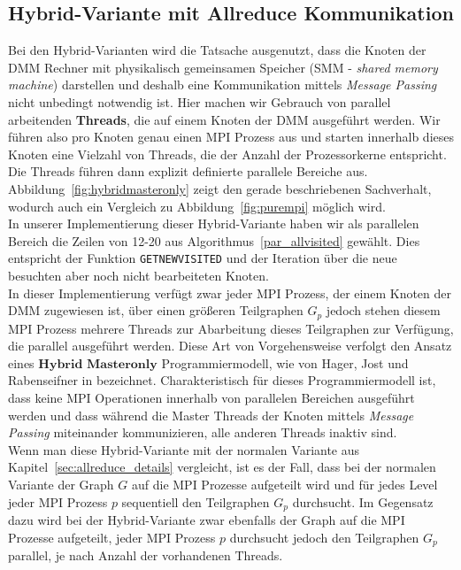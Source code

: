 \documentclass[11pt,a4paper]{article}
\begin{document}
\subsection{Hybrid-Variante mit Allreduce Kommunikation}
Bei den Hybrid-Varianten wird die Tatsache ausgenutzt, dass die Knoten der DMM Rechner mit physikalisch gemeinsamen Speicher (SMM - \textit{shared memory machine}) darstellen und deshalb eine Kommunikation mittels \textit{Message Passing} nicht unbedingt notwendig ist. Hier machen wir Gebrauch von parallel arbeitenden \textbf{Threads}, die auf einem Knoten der DMM ausgeführt werden. Wir führen also pro Knoten genau einen MPI Prozess aus und starten innerhalb dieses Knoten eine Vielzahl von Threads, die der Anzahl der Prozessorkerne entspricht. Die Threads führen dann explizit definierte parallele Bereiche aus. Abbildung~\ref{fig:hybridmasteronly} zeigt den gerade beschriebenen Sachverhalt, wodurch auch ein Vergleich zu Abbildung~\ref{fig:purempi} möglich wird.\\
In unserer Implementierung dieser Hybrid-Variante haben wir als parallelen Bereich die Zeilen von 12-20 aus Algorithmus~\ref{par_allvisited} gewählt. Dies entspricht der Funktion \lstinline{GETNEWVISITED} und der Iteration über die neue besuchten aber noch nicht bearbeiteten Knoten.\\
In dieser Implementierung verfügt zwar jeder MPI Prozess, der einem Knoten der DMM zugewiesen ist, über einen größeren Teilgraphen \(G_{p}\) jedoch stehen diesem MPI Prozess mehrere Threads zur Abarbeitung dieses Teilgraphen zur Verfügung, die parallel ausgeführt werden. Diese Art von Vorgehensweise verfolgt den Ansatz eines \textit{$\textbf{Hybrid Masteronly}$} Programmiermodell, wie von Hager, Jost und Rabenseifner in \cite{hybrid} bezeichnet. Charakteristisch für dieses Programmiermodell ist, dass keine MPI Operationen innerhalb von parallelen Bereichen ausgeführt werden und dass während die Master Threads der Knoten mittels \textit{Message Passing} miteinander kommunizieren, alle anderen Threads inaktiv sind.\\
Wenn man diese Hybrid-Variante mit der normalen Variante aus Kapitel~\ref{sec:allreduce_details} vergleicht, ist es der Fall, dass bei der normalen Variante der Graph \(G\) auf die MPI Prozesse aufgeteilt wird und für jedes Level jeder MPI Prozess \(p\) sequentiell den Teilgraphen \(G_{p}\) durchsucht. Im Gegensatz dazu wird bei der Hybrid-Variante zwar ebenfalls der Graph auf die MPI Prozesse aufgeteilt, jeder MPI Prozess \(p\) durchsucht jedoch den Teilgraphen \(G_{p}\) parallel, je nach Anzahl der vorhandenen Threads.
\end{document}
